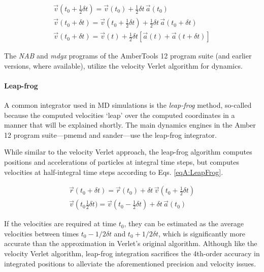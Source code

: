 \begin{align}
   \vec{v}\left(t_0 + \frac 1 2 \delta t\right) = \vec{v}(t_0) + \frac 1 2
         \delta t \, \vec{a}(t_0) \nonumber \\
   \vec{v}(t_0 + \delta t) = \vec{v}\left(t_0 + \frac 1 2 \delta t\right) +
         \frac 1 2 \delta t \, \vec{a}(t_0 + \delta t) \nonumber \\
   \vec{v}(t_0 + \delta t) = \vec{v}(t) + \frac 1 2 \delta t \left[ \vec{a}(t) +
         \vec{a}(t + \delta t) \right]
   \label{eqA:VelVerletVelocities}
\end{align}

The \emph{NAB} and \emph{mdgx} programs of the AmberTools 12 program suite (and
earlier versions, where available), utilize the velocity Verlet algorithm for
dynamics.

\paragraph{Leap-frog}

A common integrator used in MD simulations is the \emph{leap-frog} method,
so-called because the computed velocities `leap' over the computed coordinates
in a manner that will be explained shortly. The main dynamics engines in the
Amber 12 program suite---pmemd and sander---use the leap-frog integrator.

While similar to the velocity Verlet approach, the leap-frog algorithm computes
positions and accelerations of particles at integral time steps, but
computes velocities at half-integral time steps according to Eqs.
\ref{eqA:LeapFrog}.

\begin{align}
   \vec{r}(t_0 + \delta t) = \vec{r}(t_0) + \delta t \, \vec{v}\left(t_0 + \frac
         1 2 \delta t \right) \nonumber \\
   \vec{v}\left(t_0 \frac 1 2 \delta t) = \vec{v}\left(t_0 - \frac 1 2 \delta t
         \right) + \delta t \, \vec{a}(t_0)
   \label{eqA:LeapFrog}
\end{align}

If the velocities are required at time $t_0$, they can be estimated as the
average velocities between times $t_0 - 1/2\delta t$ and $t_0 + 1/2 \delta t$,
which is significantly more accurate than the approximation in Verlet's original
algorithm. Although like the velocity Verlet algorithm, leap-frog integration
sacrifices the 4th-order accuracy in integrated positions to alleviate the
aforementioned precision and velocity issues. \cite{Allen_Tildesley}
